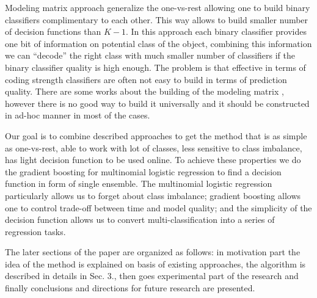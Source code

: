 \documentclass{article}
\begin{document}
Modeling matrix approach generalize the one-vs-rest allowing one to build binary classifiers complimentary to each other. This way allows to build smaller number of decision functions than $K-1$. In this approach each binary classifier provides one bit of information on potential class of the object, combining this information we can ``decode'' the right class with much smaller number of classifiers if the binary classifier quality is high enough. The problem is that effective in terms of coding strength classifiers are often not easy to build in terms of prediction quality. There are some works about the building of the modeling matrix \cite{Zhao_sparseoutput, modelmatrix2}, however there is no good way to build it universally and it should be constructed in ad-hoc manner in most of the cases.

Our goal is to combine described approaches to get the method that is as simple as one-vs-rest, able to work with lot of classes, less sensitive to class imbalance, has light decision function to be used online. To achieve these properties we do the gradient boosting for multinomial logistic regression to find a decision function in form of single ensemble. The multinomial logistic regression particularly allows us to forget about class imbalance; gradient boosting allows one to control trade-off between time and model quality; and the simplicity of the decision function allows us to convert multi-classification into a series of regression tasks.

The later sections of the paper are organized as follows: in motivation part the idea of the method is explained on basis of existing approaches, the algorithm is described in details in Sec. 3., then goes experimental part of the research and finally conclusions and directions for future research are presented.


\end{document}
